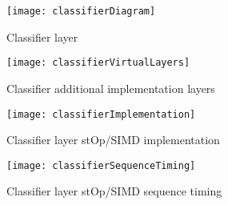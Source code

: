 \begin{figure}[h]
  \centering
  \captionsetup{justification=centering}
  \captionsetup{width=0.9\textwidth}
  \begin{minipage}{1\textwidth}
    \centering
    \centerline{
    \mbox{\texttt{[image: classifierDiagram]}}
    }
    \center\caption{Classifier layer}
    \label{fig:classifier layer}
  \end{minipage}
  \bigskip
  \vspace{0.5cm}
  \begin{minipage}{1\textwidth}
    \centering
    \centerline{
    \mbox{\texttt{[image: classifierVirtualLayers]}}
    }
    \caption{Classifier additional implementation layers}
    \label{fig:classifier additional layers}
  \end{minipage}
\end{figure}

\begin{sidewaysfigure}[h]
  \centering
  \captionsetup{justification=centering}
  \captionsetup{width=0.9\textwidth}
  \begin{minipage}{1\textwidth}
    \centering
    \centerline{
    \mbox{\texttt{[image: classifierImplementation]}}
    }
    \caption{Classifier layer stOp/SIMD implementation}
    \label{fig:classifier implementation}
  \end{minipage}
  \bigskip
  \vspace{5mm}
  \begin{minipage}{1\textwidth}
    \centering
    \centerline{
    \mbox{\texttt{[image: classifierSequenceTiming]}}
    }
    \center\caption{Classifier layer stOp/SIMD sequence timing}
    \label{fig:classifier implementation sequence timing}
  \end{minipage}
\end{sidewaysfigure}


